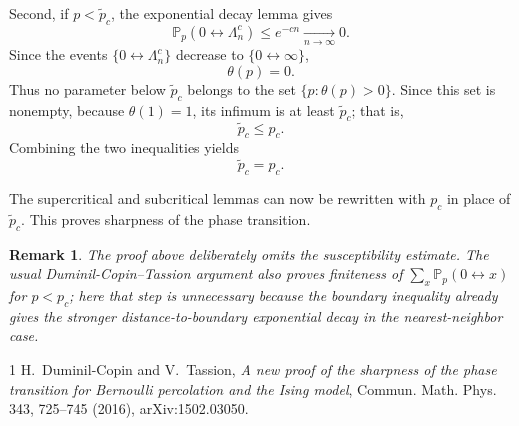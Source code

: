 \documentclass[11pt]{article}
\newtheorem{remark}{Remark}
\newcommand{\Pp}{\mathbb P_p}
\newcommand{\conn}{\longleftrightarrow}
\newcommand{\pct}{\widetilde p_c}
\begin{document}
Second, if $p<\pct$, the exponential decay lemma gives
\[
 \Pp(0\conn\Lambda_n^c)\le e^{-cn}\xrightarrow[n\to\infty]{}0.
\]
Since the events $\{0\conn\Lambda_n^c\}$ decrease to $\{0\conn\infty\}$,
\[
 \theta(p)=0.
\]
Thus no parameter below $\pct$ belongs to the set $\{p:\theta(p)>0\}$. Since this set is nonempty, because $\theta(1)=1$, its infimum is at least $\pct$; that is,
\[
 \pct\le p_c.
\]
Combining the two inequalities yields
\[
 \pct=p_c.
\]

The supercritical and subcritical lemmas can now be rewritten with $p_c$ in place of $\pct$. This proves sharpness of the phase transition.

\begin{remark}
The proof above deliberately omits the susceptibility estimate. The usual Duminil-Copin--Tassion argument also proves finiteness of $\sum_x\Pp(0\conn x)$ for $p<p_c$; here that step is unnecessary because the boundary inequality already gives the stronger distance-to-boundary exponential decay in the nearest-neighbor case.
\end{remark}

\begin{thebibliography}{1}
H.~Duminil-Copin and V.~Tassion,
\emph{A new proof of the sharpness of the phase transition for Bernoulli percolation and the Ising model},
Commun. Math. Phys. 343, 725--745 (2016), arXiv:1502.03050.
\end{thebibliography}
\end{document}
